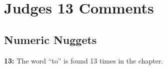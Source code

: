 \section{Judges 13 Comments}

\subsection{Numeric Nuggets}
\textbf{13: } The word ``to'' is found 13 times in the chapter.

